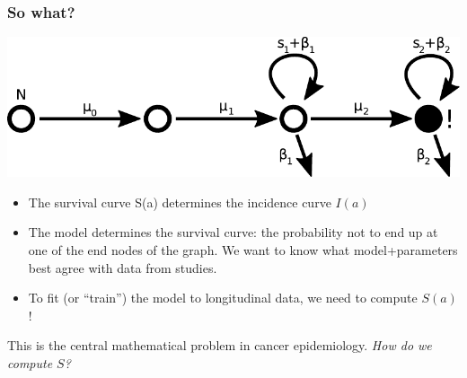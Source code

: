 \documentclass{beamer}
\begin{document}
\begin{frame}
    \frametitle{So what?}

    \includegraphics[width=1.00\textwidth]{figures/diagram3}

    \begin{itemize}
        \item The survival curve S(a) determines the incidence curve $I(a)$ 
        \item The model determines the survival curve: the probability not to
        end up at one of the end nodes of the graph. We want to know what model+parameters best agree with
        data from studies.
        \item To fit (or ``train'') the model to longitudinal data, we need to compute $S(a)$!
    \end{itemize}

    \;

    This is the central mathematical problem in cancer epidemiology. \emph{How do we compute $S$?}
\end{frame}
\end{document}
